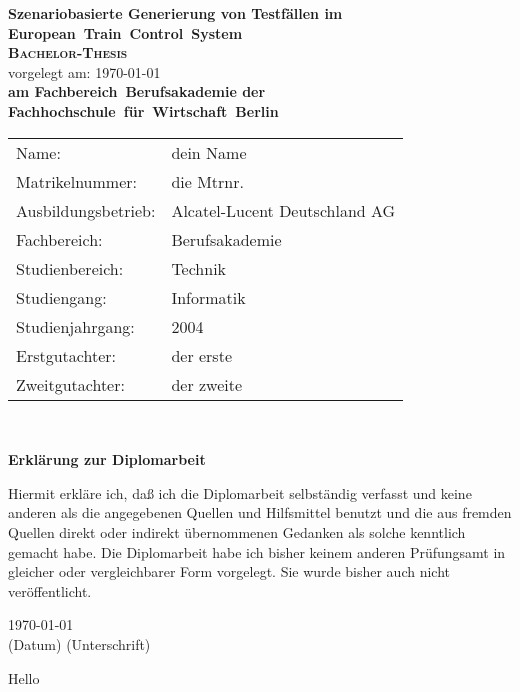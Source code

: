 \documentclass[a4paper,11pt,titlepage]{scrreprt}
\begin{document}

\begin{titlepage}
    \begin{center}
    \huge \textbf{\textsf{Szenariobasierte Generierung von Testfällen im European~Train~Control~System}} \\
    \vspace{2cm}
    \LARGE\textbf{\textsc{Bachelor-Thesis}}\\
    \vspace{1cm}
    \normalsize
    vorgelegt am: \today \\
    \vspace{2.5cm}
    \large \textbf{am Fachbereich~Berufsakademie der Fachhochschule~für~Wirtschaft~Berlin}\\
    \vspace{3cm}
    \end{center}
 \normalsize{
    \begin{tabular}{ll}
    	Name: & {dein Name} \\
    	Matrikelnummer: & {die Mtrnr.} \\
    	Ausbildungsbetrieb: & Alcatel-Lucent Deutschland AG\\
    	Fachbereich: & Berufsakademie\\
    	Studienbereich: & Technik\\
    	Studiengang: & Informatik\\
    	Studienjahrgang: & 2004\\
      Erstgutachter: & {der erste} \\
      Zweitgutachter: & {der zweite} \\
    \end{tabular}\\
    }
\end{titlepage}


\begin{center}
\large
\phantom{erste Zeile}
\vspace{2.5cm}
\textbf{Erklärung zur Diplomarbeit}\\
\vspace{0.5cm}
\end{center}
\normalsize
Hiermit erkläre ich, daß ich die Diplomarbeit selbständig verfasst und keine anderen 
als die angegebenen Quellen und Hilfsmittel benutzt und die aus fremden Quellen direkt 
oder indirekt übernommenen Gedanken als solche kenntlich gemacht habe. Die Diplomarbeit 
habe ich bisher keinem anderen Prüfungsamt in gleicher oder vergleichbarer Form vorgelegt. 
Sie wurde bisher auch nicht veröffentlicht.

\vspace{9cm}

\today\\              %

\smallskip
\small\hspace{0cm}(Datum) \hspace{8cm} (Unterschrift)
\normalsize
\newpage

\tableofcontents      %

\newpage
\setcounter{page}{1}

Hello
\end{document}
